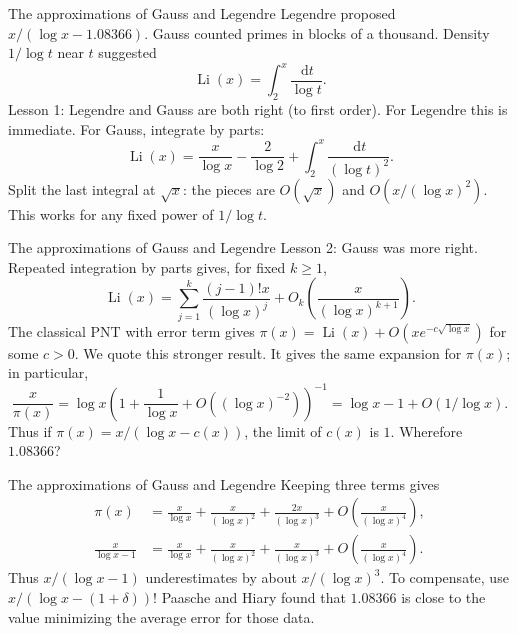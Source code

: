 \documentclass[aspectratio=169,11pt]{beamer}
\newcommand{\dd}{\,\mathrm d}
\begin{document}
\begin{frame}{The approximations of Gauss and Legendre}
Legendre proposed $x/(\log x-1.08366)$. Gauss counted primes in blocks of a thousand. Density $1/\log t$ near $t$ suggested
\[\operatorname{Li}(x)=\int_2^x\frac{\dd t}{\log t}.\]
Lesson 1: Legendre and Gauss are both right (to first order). For Legendre this is immediate. For Gauss, integrate by parts:
\[\operatorname{Li}(x)=\frac{x}{\log x}-\frac2{\log2}+\int_2^x\frac{\dd t}{(\log t)^2}.\]
Split the last integral at $\sqrt x$: the pieces are $O(\sqrt x)$ and $O(x/(\log x)^2)$. This works for any fixed power of $1/\log t$.
\end{frame}
\begin{frame}{The approximations of Gauss and Legendre}
Lesson 2: Gauss was more right. Repeated integration by parts gives, for fixed $k\ge1$,
\[\operatorname{Li}(x)=\sum_{j=1}^k\frac{(j-1)!x}{(\log x)^j}+O_k\left(\frac{x}{(\log x)^{k+1}}\right).\]
The classical PNT with error term gives $\pi(x)=\operatorname{Li}(x)+O(xe^{-c\sqrt{\log x}})$ for some $c>0$. We quote this stronger result. It gives the same expansion for $\pi(x)$; in particular,
\[\frac{x}{\pi(x)}=\log x\left(1+\frac1{\log x}+O((\log x)^{-2})\right)^{-1}=\log x-1+O(1/\log x).\]
Thus if $\pi(x)=x/(\log x-c(x))$, the limit of $c(x)$ is $1$. Wherefore $1.08366$?
\end{frame}
\begin{frame}{The approximations of Gauss and Legendre}
Keeping three terms gives
\begin{align*}
\pi(x)&=\frac{x}{\log x}+\frac{x}{(\log x)^2}+\frac{2x}{(\log x)^3}+O\left(\frac{x}{(\log x)^4}\right),\\
\frac{x}{\log x-1}&=\frac{x}{\log x}+\frac{x}{(\log x)^2}+\frac{x}{(\log x)^3}+O\left(\frac{x}{(\log x)^4}\right).
\end{align*}
Thus $x/(\log x-1)$ underestimates by about $x/(\log x)^3$. To compensate, use $x/(\log x-(1+\delta))$! Paasche and Hiary found that $1.08366$ is close to the value minimizing the average error for those data.
\end{frame}
\end{document}
